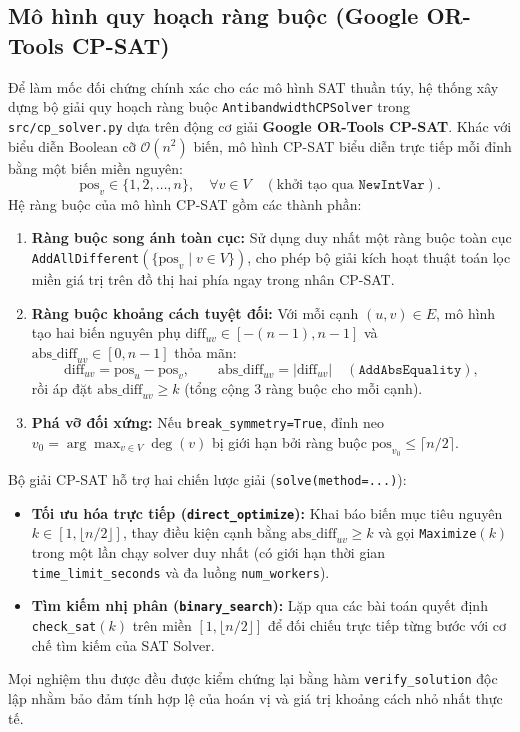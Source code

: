 \documentclass[a4paper,fleqn]{cas-sc}
\begin{document}
\subsection{Mô hình quy hoạch ràng buộc (Google OR-Tools CP-SAT)}
Để làm mốc đối chứng chính xác cho các mô hình SAT thuần túy, hệ thống xây dựng bộ giải quy hoạch ràng buộc \texttt{AntibandwidthCPSolver} trong \texttt{src/cp\_solver.py} dựa trên động cơ giải \textbf{Google OR-Tools CP-SAT}. Khác với biểu diễn Boolean cỡ $\mathcal{O}(n^2)$ biến, mô hình CP-SAT biểu diễn trực tiếp mỗi đỉnh bằng một biến miền nguyên:
\[
\text{pos}_v \in \{1, 2, \dots, n\}, \quad \forall v \in V \quad (\text{khởi tạo qua } \texttt{NewIntVar}).
\]
Hệ ràng buộc của mô hình CP-SAT gồm các thành phần:
\begin{enumerate}
    \item \textbf{Ràng buộc song ánh toàn cục:} Sử dụng duy nhất một ràng buộc toàn cục \texttt{AddAllDifferent}$(\{\text{pos}_v \mid v \in V\})$, cho phép bộ giải kích hoạt thuật toán lọc miền giá trị trên đồ thị hai phía ngay trong nhân CP-SAT.
    \item \textbf{Ràng buộc khoảng cách tuyệt đối:} Với mỗi cạnh $(u, v) \in E$, mô hình tạo hai biến nguyên phụ $\text{diff}_{uv} \in [-(n-1), n-1]$ và $\text{abs\_diff}_{uv} \in [0, n-1]$ thỏa mãn:
    \[
    \text{diff}_{uv} = \text{pos}_u - \text{pos}_v, \qquad \text{abs\_diff}_{uv} = |\text{diff}_{uv}| \quad (\texttt{AddAbsEquality}),
    \]
    rồi áp đặt $\text{abs\_diff}_{uv} \ge k$ (tổng cộng 3 ràng buộc cho mỗi cạnh).
    \item \textbf{Phá vỡ đối xứng:} Nếu \texttt{break\_symmetry=True}, đỉnh neo $v_0 = \arg\max_{v \in V} \deg(v)$ bị giới hạn bởi ràng buộc $\text{pos}_{v_0} \le \lceil n / 2 \rceil$.
\end{enumerate}

Bộ giải CP-SAT hỗ trợ hai chiến lược giải (\texttt{solve(method=...)}):
\begin{itemize}
    \item \textbf{Tối ưu hóa trực tiếp (\texttt{direct\_optimize}):} Khai báo biến mục tiêu nguyên $k \in [1, \lfloor n/2 \rfloor]$, thay điều kiện cạnh bằng $\text{abs\_diff}_{uv} \ge k$ và gọi \texttt{Maximize}$(k)$ trong một lần chạy solver duy nhất (có giới hạn thời gian \texttt{time\_limit\_seconds} và đa luồng \texttt{num\_workers}).
    \item \textbf{Tìm kiếm nhị phân (\texttt{binary\_search}):} Lặp qua các bài toán quyết định \texttt{check\_sat}$(k)$ trên miền $[1, \lfloor n/2 \rfloor]$ để đối chiếu trực tiếp từng bước với cơ chế tìm kiếm của SAT Solver.
\end{itemize}
Mọi nghiệm thu được đều được kiểm chứng lại bằng hàm \texttt{verify\_solution} độc lập nhằm bảo đảm tính hợp lệ của hoán vị và giá trị khoảng cách nhỏ nhất thực tế.
\end{document}
